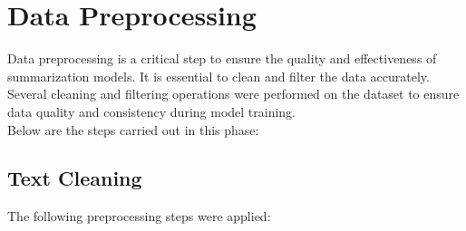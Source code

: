 \section{Data Preprocessing}
Data preprocessing is a critical step to ensure the quality and effectiveness of summarization models. It is essential to clean and filter the data accurately.\\
Several cleaning and filtering operations were performed on the dataset to ensure data quality and consistency during model training.\\
Below are the steps carried out in this phase:
\subsection{Text Cleaning}
The following preprocessing steps were applied:

